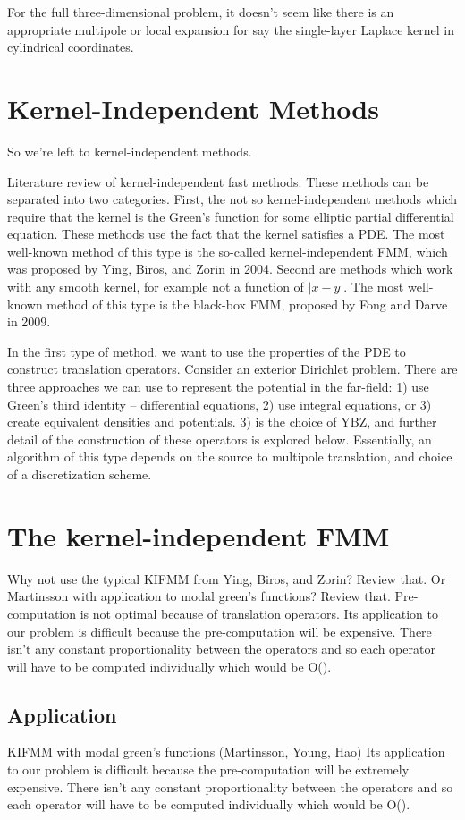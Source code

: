 \documentclass[11pt, oneside]{article}   	%
\begin{document}
For the full three-dimensional problem, it doesn't seem like there is an appropriate multipole or local expansion for say the single-layer Laplace kernel in cylindrical coordinates.

\section{Kernel-Independent Methods}
So we're left to kernel-independent methods.

Literature review of kernel-independent fast methods. These methods can be separated into two categories. First, the not so kernel-independent methods which require that the kernel is the Green's function for some elliptic partial differential equation. These methods use the fact that the kernel satisfies a PDE. The most well-known method of this type is the so-called kernel-independent FMM, which was proposed by Ying, Biros, and Zorin in 2004. Second are methods which work with any smooth kernel, for example not a function of $|x-y|$. The most well-known method of this type is the black-box FMM, proposed by Fong and Darve in 2009.

In the first type of method, we want to use the properties of the PDE to construct translation operators. Consider an exterior Dirichlet problem. There are three approaches we can use to represent the potential in the far-field: 1) use Green's third identity -- differential equations, 2) use integral equations, or 3) create equivalent densities and potentials. 3) is the choice of YBZ, and further detail of the construction of these operators is explored below. Essentially, an algorithm of this type depends on the source to multipole translation, and choice of a discretization scheme.

\section{The kernel-independent FMM}
Why not use the typical KIFMM from Ying, Biros, and Zorin? Review that. Or Martinsson with application to modal green's functions? Review that. Pre-computation is not optimal because of translation operators. Its application to our problem is difficult because the pre-computation will be expensive. There isn't any constant proportionality between the operators and so each operator will have to be computed individually which would be O().

\subsection{Application}
KIFMM with modal green's functions (Martinsson, Young, Hao)
Its application to our problem is difficult because the pre-computation will be extremely expensive. There isn't any constant proportionality between the operators and so each operator will have to be computed individually which would be O().
\end{document}

